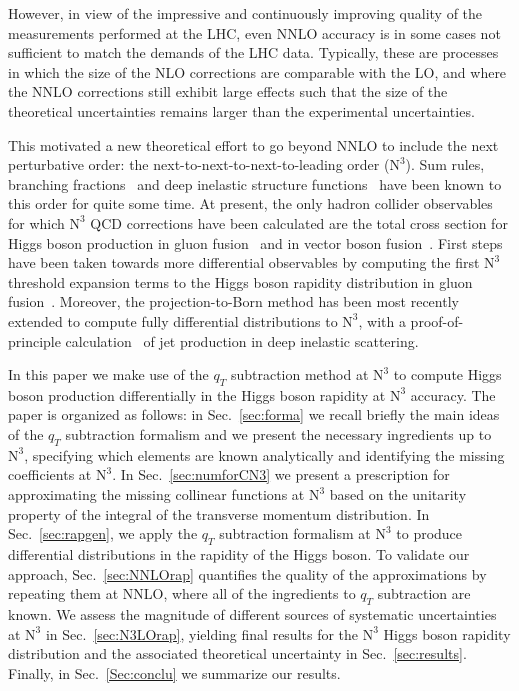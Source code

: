 \documentclass[12pt]{article}
\DeclareRobustCommand{\qt}{\ensuremath{q_T}\xspace}
\DeclareRobustCommand{\LO}{\text{LO}\xspace}
\DeclareRobustCommand{\N}[1]{\ensuremath{\text{N}^{#1}}} %
\begin{document}
However, in view of the impressive and continuously improving quality of the measurements performed at the LHC, even NNLO accuracy is in some cases not sufficient to match the demands of the LHC data. Typically, these are processes in which the size of the NLO corrections are comparable with the LO, and where the NNLO corrections still exhibit large effects such that the size of the theoretical uncertainties remains larger than the experimental uncertainties. 

This motivated a new theoretical effort to go beyond NNLO to include the next perturbative order: the next-to-next-to-next-to-leading order (\N3\LO). Sum rules, branching fractions~\cite{Chetyrkin:1994js} and deep inelastic structure functions~\cite{Vermaseren:2005qc} have been known to this order for quite some time. At present, the only hadron collider observables for which \N3\LO QCD corrections have been calculated are the total cross section for Higgs boson  production in gluon fusion~\cite{Anastasiou:2015ema,Mistlberger:2018etf} and in vector boson 
fusion~\cite{Dreyer:2016oyx}. First steps have been taken towards more differential observables by computing the first \N3\LO threshold expansion terms to the Higgs boson rapidity distribution in gluon fusion~\cite{Dulat:2017prg}. Moreover, the projection-to-Born method has been most recently extended to compute fully differential distributions to \N3\LO, with a proof-of-principle calculation~\cite{Currie:2018fgr} of jet production in deep inelastic scattering. 

In this paper we make use of the $\qt$ subtraction method at \N3\LO  to compute Higgs boson production differentially in the Higgs boson rapidity at \N3\LO accuracy. The paper is organized as follows: in Sec.~\ref{sec:forma} we recall briefly the main ideas of the $\qt$ subtraction formalism and we present the necessary ingredients up to  \N3\LO, specifying which elements are known analytically and identifying the missing coefficients at \N3\LO. In Sec.~\ref{sec:numforCN3} we present a prescription for approximating the missing collinear functions at \N3\LO based on the unitarity property of the integral of the transverse momentum distribution. In Sec.~\ref{sec:rapgen}, we apply the $\qt$ subtraction formalism at \N3\LO to produce differential distributions in the rapidity of the Higgs boson. To validate our approach, Sec.~\ref{sec:NNLOrap} quantifies the quality of the approximations by repeating them at NNLO, where all of the ingredients to $\qt$ subtraction are known. We assess the magnitude of different sources of systematic uncertainties at  \N3\LO in Sec.~\ref{sec:N3LOrap}, yielding final results for the \N3\LO Higgs boson rapidity distribution and the associated theoretical uncertainty in Sec.~\ref{sec:results}. Finally, in Sec.~\ref{Sec:conclu} we summarize our results.
\end{document}
